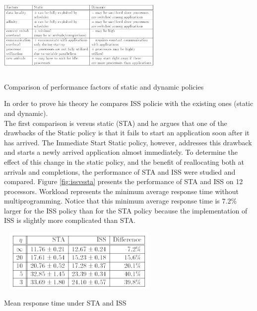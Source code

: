 \documentclass[a4paper,10pt]{article}
\makeatletter
\newenvironment{figurehere}{\def\@captype{figure}\vspace{2ex}}{\vspace{2ex}}
\makeatother
\begin{document}
\begin{multicols}{2}
\begin{figurehere}
 \centering
 \includegraphics[width=8cm, height=4cm]{./eps/tabella.png}
 \caption{Comparison of performance factors of static and dynamic policies}
 \label{fig:tabella}
\end{figurehere}

In order to prove his theory he compares ISS policie with the existing ones (static and dynamic).\\
The first comparison is versus static (STA) and he argues that one of the drawbacks of the Static policy is that it fails to start an application soon after it has arrived. The Immediate Start Static policy, however, addresses this drawback and starts a newly arrived application almost immediately. To determine the effect of this change in the static policy, and the benefit of reallocating both at arrivals and completions, the performance of STA and ISS were studied and compared.
Figure \ref{fig:issvssta} presents the performance of STA and ISS on 12  processors. Workload represents the minimum average response time without multiprogramming. Notice that this minimum average response time is 7.2\% larger for the ISS policy than for the STA policy because the implementation of ISS is slightly more complicated than STA.

\begin{figurehere}
 \centering
 \includegraphics[width=8cm, height=3cm]{./eps/issvssta.png}
 \caption{Mean response time under STA and ISS}
 \label{fig:issvssta}
\end{figurehere}


\end{multicols}
\end{document}
